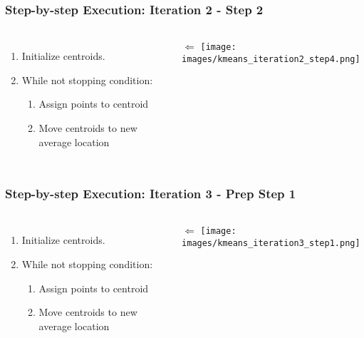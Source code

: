 \documentclass{beamer}
\begin{document}
\begin{frame}
  \frametitle{Step-by-step Execution: Iteration 2 - Step 2 }
  \begin{columns}
      \begin{enumerate}
        \item Initialize centroids. \vspace{2mm}
        \item While not stopping condition: \vspace{2mm}
        \begin{enumerate}
          \item Assign points to centroid \vspace{2mm}
          \item Move centroids to new average location
        \end{enumerate}
      \end{enumerate}
      \vspace{39mm} $\Longleftarrow$
      \texttt{[image: images/kmeans\_iteration2\_step4.png]}
  \end{columns}
\end{frame}

\begin{frame}
  \frametitle{Step-by-step Execution: Iteration 3 - Prep Step 1}
  \begin{columns}
      \begin{enumerate}
        \item Initialize centroids. \vspace{2mm}
        \item While not stopping condition: \vspace{2mm}
        \begin{enumerate}
          \item Assign points to centroid \vspace{2mm}
          \item Move centroids to new average location
        \end{enumerate}
      \end{enumerate}
      \vspace{1mm} $\Longleftarrow$
      \texttt{[image: images/kmeans\_iteration3\_step1.png]}
  \end{columns}
\end{frame}
\end{document}

